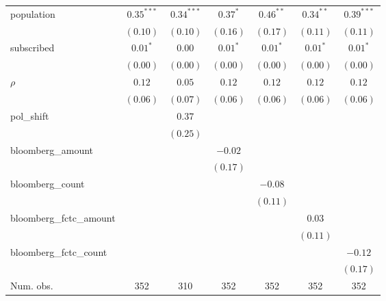 \begin{table}[!h]
\begin{center}
\begin{tabular}{l c c c c c c }
population              & $0.35^{***}$ & $0.34^{***}$ & $0.37^{*}$   & $0.46^{**}$  & $0.34^{**}$  & $0.39^{***}$ \\
                        & $(0.10)$     & $(0.10)$     & $(0.16)$     & $(0.17)$     & $(0.11)$     & $(0.11)$     \\
subscribed              & $0.01^{*}$   & $0.00$       & $0.01^{*}$   & $0.01^{*}$   & $0.01^{*}$   & $0.01^{*}$   \\
                        & $(0.00)$     & $(0.00)$     & $(0.00)$     & $(0.00)$     & $(0.00)$     & $(0.00)$     \\
$\rho$                  & $0.12$       & $0.05$       & $0.12$       & $0.12$       & $0.12$       & $0.12$       \\
                        & $(0.06)$     & $(0.07)$     & $(0.06)$     & $(0.06)$     & $(0.06)$     & $(0.06)$     \\
pol\_shift              &              & $0.37$       &              &              &              &              \\
                        &              & $(0.25)$     &              &              &              &              \\
bloomberg\_amount       &              &              & $-0.02$      &              &              &              \\
                        &              &              & $(0.17)$     &              &              &              \\
bloomberg\_count        &              &              &              & $-0.08$      &              &              \\
                        &              &              &              & $(0.11)$     &              &              \\
bloomberg\_fctc\_amount &              &              &              &              & $0.03$       &              \\
                        &              &              &              &              & $(0.11)$     &              \\
bloomberg\_fctc\_count  &              &              &              &              &              & $-0.12$      \\
                        &              &              &              &              &              & $(0.17)$     \\
\midrule
Num. obs.               & 352          & 310          & 352          & 352          & 352          & 352          \\

\end{tabular}
\end{center}
\end{table}
